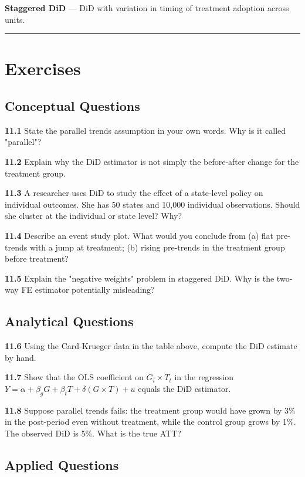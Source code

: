 \textbf{Staggered DiD} --- DiD with variation in timing of treatment adoption across units.

\medskip\hrule\medskip

\section{Exercises}

\subsection{Conceptual Questions}

\textbf{11.1} State the parallel trends assumption in your own words. Why is it called "parallel"?

\textbf{11.2} Explain why the DiD estimator is not simply the before-after change for the treatment group.

\textbf{11.3} A researcher uses DiD to study the effect of a state-level policy on individual outcomes. She has 50 states and 10,000 individual observations. Should she cluster at the individual or state level? Why?

\textbf{11.4} Describe an event study plot. What would you conclude from (a) flat pre-trends with a jump at treatment; (b) rising pre-trends in the treatment group before treatment?

\textbf{11.5} Explain the "negative weights" problem in staggered DiD. Why is the two-way FE estimator potentially misleading?

\subsection{Analytical Questions}

\textbf{11.6} Using the Card-Krueger data in the table above, compute the DiD estimate by hand.

\textbf{11.7} Show that the OLS coefficient on $G_i \times T_t$ in the regression $Y = \alpha + \beta_g G + \beta_t T + \delta (G \times T) + u$ equals the DiD estimator.

\textbf{11.8} Suppose parallel trends fails: the treatment group would have grown by 3\% in the post-period even without treatment, while the control group grows by 1\%. The observed DiD is 5\%. What is the true ATT?

\subsection{Applied Questions}

